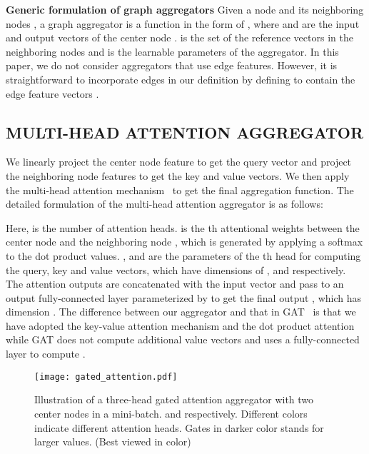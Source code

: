 \documentclass{article}
\begin{document}
	\textbf{Generic formulation of graph aggregators} \quad
	Given a node  and its neighboring nodes , a graph aggregator is a function  in the form of ,
	where  and  are the input and output vectors of the center node .  is the set of the reference vectors in the neighboring nodes and  is the learnable parameters of the aggregator. In this paper, we do not consider aggregators that use edge features. However, it is straightforward to incorporate edges in our definition by defining  to contain the edge feature vectors .

	
\subsection{MULTI-HEAD ATTENTION AGGREGATOR}
	We linearly project the center node feature  to get the query vector and project the neighboring node features to get the key and value vectors. We then apply the multi-head attention mechanism~\citep{vaswani2017attention} to get the final aggregation function. The detailed formulation of the multi-head attention aggregator is as follows:
	\vskip -0.1in
	
	\vskip -0.1in
	Here,  is the number of attention heads.  is the th attentional weights between the center node  and the neighboring node , which is generated by applying a softmax to the dot product values. ,  and  are the parameters of the th head for computing the query, key and value vectors, which have dimensions of ,  and  respectively. The  attention outputs are concatenated with the input vector and pass to an output fully-connected layer parameterized by  to get the final output , which has dimension . 
	The difference between our aggregator and that in GAT~\citep{velivckovic2017graph} is that we have adopted the key-value attention mechanism and the dot product attention while GAT does not compute additional value vectors and uses a fully-connected layer to compute .
	
	
\begin{figure}[bt!]
		\centering
		\texttt{[image: gated\_attention.pdf]}
		\caption{Illustration of a three-head gated attention aggregator with two center nodes in a mini-batch.  and  respectively. Different colors indicate different attention heads. Gates in darker color stands for larger values. (Best viewed in color)}
		\label{fig:GaAN}
	\end{figure}
	
\end{document}
